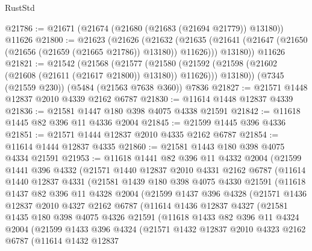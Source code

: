 \begin{lexlean}{RustStd}
\begin{coremodule}
{\begin{coremodule}
{{{{{{{{{{{{{{{{{{{{{{{{{{{{{{{@21786 := @21671 (@21674 (@21680 (@21683 (@21694 @21779)) @13180)) @11626
@21800 := @21623
    (@21626
      (@21632
        (@21635 (@21641 (@21647 (@21650 (@21656 (@21659 (@21665 @21786)) @13180)) @11626)))
        @13180))
    @11626
@21821 := @21542
    (@21568
      (@21577
        (@21580 (@21592 (@21598 (@21602 (@21608 (@21611 (@21617 @21800)) @13180)) @11626)))
        @13180))
    (@7345 (@21559 @230))
    (@5484 (@21563 @7638 @360))
    @7836
@21827 := @21571 @1448 @12837 @2010 @4339 @2162 @6787
@21830 := @11614 @1448 @12837 @4339
@21836 := @21581 @1447 @180 @398 @4075 @4338 @21591
@21842 := @11618 @1445 @82 @396 @11 @4336 @2004
@21845 := @21599 @1445 @396 @4336
@21851 := @21571 @1444 @12837 @2010 @4335 @2162 @6787
@21854 := @11614 @1444 @12837 @4335
@21860 := @21581 @1443 @180 @398 @4075 @4334 @21591
@21953 := @11618
    @1441
    @82
    @396
    @11
    @4332
    @2004
    (@21599
      @1441
      @396
      @4332
      (@21571
        @1440
        @12837
        @2010
        @4331
        @2162
        @6787
        (@11614
          @1440
          @12837
          @4331
          (@21581
            @1439
            @180
            @398
            @4075
            @4330
            @21591
            (@11618
              @1437
              @82
              @396
              @11
              @4328
              @2004
              (@21599
                @1437
                @396
                @4328
                (@21571
                  @1436
                  @12837
                  @2010
                  @4327
                  @2162
                  @6787
                  (@11614
                    @1436
                    @12837
                    @4327
                    (@21581
                      @1435
                      @180
                      @398
                      @4075
                      @4326
                      @21591
                      (@11618
                        @1433
                        @82
                        @396
                        @11
                        @4324
                        @2004
                        (@21599
                          @1433
                          @396
                          @4324
                          (@21571
                            @1432
                            @12837
                            @2010
                            @4323
                            @2162
                            @6787
                            (@11614
                              @1432
                              @12837
}}}}}}}}}}}}}}}}}}}}}}}}}}}}}}}
\end{coremodule}}
\end{coremodule}
\end{lexlean}
